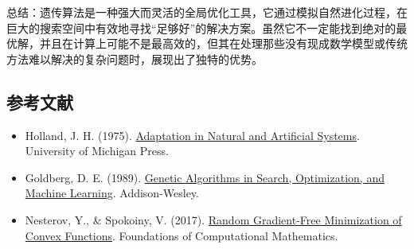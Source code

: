 总结：遗传算法是一种强大而灵活的全局优化工具，它通过模拟自然进化过程，在巨大的搜索空间中有效地寻找``足够好''的解决方案。虽然它不一定能找到绝对的最优解，并且在计算上可能不是最高效的，但其在处理那些没有现成数学模型或传统方法难以解决的复杂问题时，展现出了独特的优势。

\FloatBarrier
{}
\hypertarget{ux53c2ux8003ux6587ux732e-31}{%
\subsection{参考文献}\label{ux53c2ux8003ux6587ux732e-31}}

\vspace{0.25em}
\begin{itemize}
\tightlist
\item
  Holland, J. H. (1975). \href{https://openlibrary.org/books/OL5070129M/Adaptation_in_natural_and_artificial_systems}{Adaptation in Natural and Artificial Systems}. University of Michigan Press.
\item
  Goldberg, D. E. (1989). \href{https://openlibrary.org/books/OL2030750M/Genetic_algorithms_in_search_optimization_and_machine_learning}{Genetic Algorithms in Search, Optimization, and Machine Learning}. Addison-Wesley.
\item
  Nesterov, Y., \& Spokoiny, V. (2017). \href{https://doi.org/10.1007/s10208-015-9296-2}{Random Gradient-Free Minimization of Convex Functions}. Foundations of Computational Mathematics.
\end{itemize}

\clearpage

